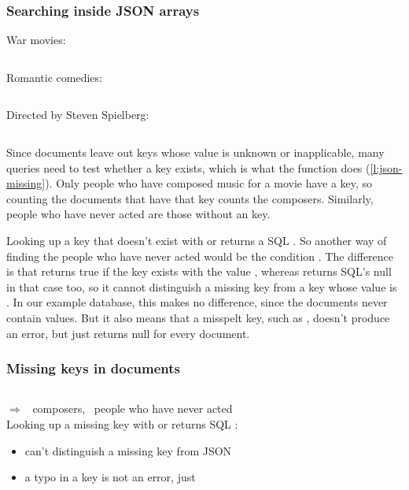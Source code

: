 \begin{frame}
    \label{s:json-lists}
    \frametitle{Searching inside JSON arrays}
    War movies: \jsonwar
    \inputminted[fontsize=\footnotesize]{sql}{code/json-list-war.sql}
    \vspace{0.3em}
    Romantic comedies: \jsonromcom
    \inputminted[fontsize=\footnotesize]{sql}{code/json-list-romcom.sql}
    \vspace{0.3em}\pause
    Directed by Steven Spielberg: \jsonspielberg
    \inputminted[fontsize=\footnotesize]{sql}{code/json-list-spielberg.sql}
    \vspace{0.2em}
    {\footnotesize}
\end{frame}
\label{l:json-lists}

Since documents leave out keys whose value is unknown or inapplicable, many queries need to test whether a key exists, which is what the  function does (\autoref{l:json-missing}).
Only people who have composed music for a movie have a  key, so counting the documents that have that key counts the composers.
Similarly, people who have never acted are those without an  key.

Looking up a key that doesn't exist with \code{->} or \code{->>} returns a SQL .
So another way of finding the people who have never acted would be the condition .
The difference is that  returns true if the key exists with the value , whereas \code{->>} returns SQL's null in that case too, so it cannot distinguish a missing key from a key whose value is .
In our example database, this makes no difference, since the documents never contain  values.
But it also means that a misspelt key, such as , doesn't produce an error, but just returns null for every document.

\begin{frame}
    \label{s:json-missing}
    \frametitle{Missing keys in documents}
    \inputminted[fontsize=\footnotesize]{sql}{code/json-exists.sql}
    \vspace{0.3em}
    $\Rightarrow$ \jsoncomposers\ composers, \jsonneveracted\ people who have never acted\\[1em]\pause
    Looking up a missing key with \code{->} or \code{->>} returns SQL :
    \begin{itemize}
        \item can't distinguish a missing key from JSON 
        \item a typo in a key is not an error, just 
    \end{itemize}
\end{frame}
\label{l:json-missing}

